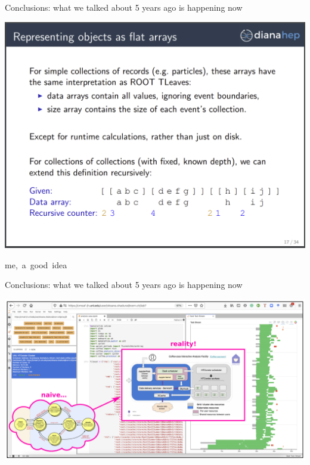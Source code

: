 \documentclass[aspectratio=169]{beamer}
\begin{document}
\begin{frame}{Conclusions: what we talked about 5 years ago is happening now}
\vspace{0.15 cm}
\begin{center}
\includegraphics[width=0.73\linewidth]{PLOTS/awkward-in-2017.png}
\end{center}

\vspace{-1.5 cm}
\hfill \mbox{me, a good idea\hspace{-0.5 cm}}
\vspace{1.5 cm}
\end{frame}

\begin{frame}{Conclusions: what we talked about 5 years ago is happening now}
\vspace{0.5 cm}

\includegraphics[width=\linewidth]{PLOTS/af-dream-to-reality.pdf}
\end{frame}
\end{document}
